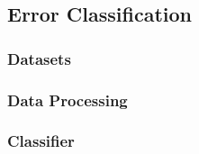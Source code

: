 \subsection{Error Classification}
\label{sec:method-error}


    \subsubsection{Datasets}
    
    \label{sec:method-error-datasets}

    \subsubsection{Data Processing}
    
    \label{sec:method-error-dataprocessing}

    \subsubsection{Classifier}
    
    \label{sec:method-error-errorclassifier}